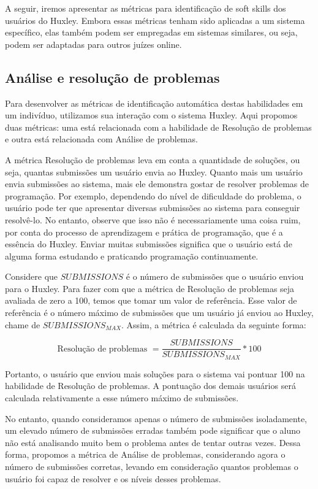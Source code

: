 A seguir, iremos apresentar as métricas para identificação de soft skills dos usuários do Huxley. Embora essas métricas tenham sido aplicadas a um sistema específico, elas também  podem ser empregadas em sistemas similares, ou seja, podem ser adaptadas para outros juízes online.

\subsection{Análise e resolução de problemas}

Para desenvolver as métricas de identificação automática destas habilidades em um indivíduo, utilizamos sua interação com o sistema Huxley. Aqui propomos duas métricas: uma está relacionada com a habilidade de Resolução de problemas e outra está relacionada com Análise de problemas.

A métrica Resolução de problemas leva em conta a quantidade de soluções, ou seja, quantas submissões um usuário envia ao Huxley. Quanto mais um usuário envia submissões ao sistema, mais ele demonstra gostar de resolver problemas de programação. Por exemplo, dependendo do nível de dificuldade do problema, o usuário pode ter que apresentar diversas submissões ao sistema para conseguir resolvê-lo. No entanto, observe que isso não é necessariamente uma coisa ruim, por conta do processo de aprendizagem e prática de programação, que é a essência do Huxley. Enviar muitas submissões significa que o usuário está de alguma forma estudando e praticando programação continuamente.

Considere que $SUBMISSIONS$ é o número de submissões que o usuário enviou para o Huxley. 
Para fazer com que a métrica de Resolução de problemas seja avaliada de zero a 100, temos que tomar um valor de referência. Esse valor de referência é o número máximo de submissões que um usuário já enviou ao Huxley, chame de $SUBMISSIONS_{MAX}$. Assim, a métrica é calculada da seguinte forma:

\begin{equation} \label{m:resolucao}
\mbox{Resolução de problemas } = \frac{SUBMISSIONS}{SUBMISSIONS_{MAX}} * 100
\end{equation}

Portanto, o usuário que enviou mais soluções para o sistema vai pontuar 100 na habilidade de Resolução de problemas. A pontuação dos demais usuários será calculada relativamente a esse número máximo de submissões.

No entanto, quando consideramos apenas o número de submissões isoladamente, um elevado número de submissões erradas também pode significar que o aluno não está analisando muito bem o problema antes de tentar outras vezes. Dessa forma, propomos a métrica de Análise de problemas, considerando agora o número de submissões corretas, levando em consideração quantos problemas o usuário foi capaz de resolver e os níveis desses problemas.


